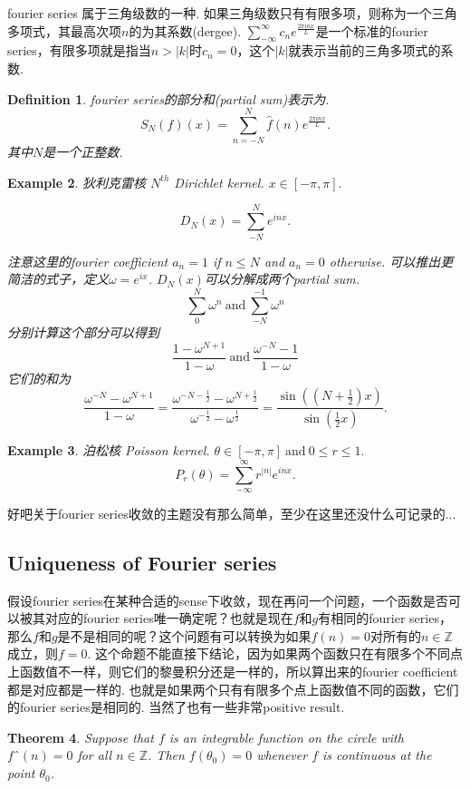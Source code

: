 \documentclass{article}
\newtheorem{theorem}{Theorem}[section]
\newtheorem{example}[theorem]{Example}
\newtheorem{definition}[theorem]{Definition}
\begin{document}
fourier series 属于三角级数的一种. 如果三角级数只有有限多项，则称为一个三角多项式，其最高次项$n$的为其系数(dergee). $\sum\limits_{-\infty}^{\infty} c_n e^{\frac{2\pi inx}{L}}$是一个标准的fourier series，有限多项就是指当$n > |k|$时$c_n = 0$，这个$|k|$就表示当前的三角多项式的系数.
 
 
\begin{definition}
\rm fourier series的部分和(partial sum)表示为.
$$
S_N(f)(x) = \sum\limits_{n=-N}^{N} \widehat{f}(n) e^{\frac{2\pi inx}{L}}.
$$
其中$N$是一个正整数.
\end{definition}

\begin{example}
\rm 狄利克雷核 $N^{th}$ Dirichlet kernel. $x \in [-\pi,\pi].$

$$
D_N(x) = \sum\limits_{-N}^{N} e^{inx}.
$$ 

注意这里的fourier coefficient $a_n = 1$ if $n \leq N$ and $a_n = 0$ otherwise. 可以推出更简洁的式子，定义$\omega = e^{ix}$. $D_N(x)$可以分解成两个partial sum.
$$
	\sum\limits_{0}^{N} \omega^n\ \text{and}\ \sum\limits_{-N}^{-1} \omega^n 
$$
分别计算这个部分可以得到
$$
	\frac{1-\omega^{N+1}}{1-\omega}\ \text{and}\ \frac{\omega^{-N}-1}{1-\omega}
$$
它们的和为
$$
\frac{\omega^{-N}-\omega^{N+1}}{1-\omega} =  \frac{\omega^{-N-\frac12}-\omega^{N+\frac12}}{\omega^{-\frac12}-\omega^{\frac12}} = \frac{\sin((N+\frac12)x)}{\sin(\frac12x)}.
$$
\end{example}

\begin{example}
\rm 泊松核 Poisson kernel. $\theta \in [-\pi,\pi]\ \text{and}\ 0 \leq r \leq 1.$
$$
P_r(\theta) = \sum\limits_{-\infty}^{\infty} r^{|n|}e^{inx}.
$$
\end{example}

好吧关于fourier series收敛的主题没有那么简单，至少在这里还没什么可记录的...

\subsection{Uniqueness of Fourier series}
假设fourier series在某种合适的sense下收敛，现在再问一个问题，一个函数是否可以被其对应的fourier series唯一确定呢？也就是现在$f$和$g$有相同的fourier series，那么$f$和$g$是不是相同的呢？这个问题有可以转换为如果$\widehat{f}(n)=0$对所有的$n \in \mathbb{Z}$成立，则$f=0$. 这个命题不能直接下结论，因为如果两个函数只在有限多个不同点上函数值不一样，则它们的黎曼积分还是一样的，所以算出来的fourier coefficient都是对应都是一样的. 也就是如果两个只有有限多个点上函数值不同的函数，它们的fourier series是相同的. 当然了也有一些非常positive result.

\begin{theorem}
Suppose that $f$ is an integrable function on the circle with
$fˆ(n)=0$ for all $n \in \mathbb{Z}$. Then $f(θ_0)= 0$ whenever $f$ is continuous at the point $θ_0$.
\end{theorem}
 
\end{document}
